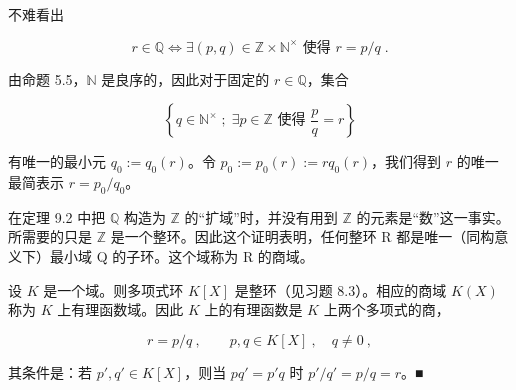 \begin{remark}

\begin{items}
\item

不难看出

\[
r\in\mathbb{Q}\Longleftrightarrow\exists\left(p,q\right)\in\mathbb{Z}\times\mathbb{N}^{\times}\text{ 使得 }r=p/q\;.
\]

由命题 5.5，$ \mathbb{N} $ 是良序的，因此对于固定的 $ r \in \mathbb{Q} $，集合

\[
\left\{q\in\mathbb{N}^{\times}\;;\;\exists p\in\mathbb{Z}\text{ 使得 }\frac{p}{q}=r\right\}
\]

有唯一的最小元 $ q_0 := q_0(r) $。令 $ p_0 := p_0(r) := r q_0(r) $，我们得到 $ r $ 的唯一最简表示 $ r = p_0/q_0 $。

\item

在定理 9.2 中把 $ \mathbb{Q} $ 构造为 $ \mathbb{Z} $ 的“扩域”时，并没有用到 $ \mathbb{Z} $ 的元素是“数”这一事实。所需要的只是 $ \mathbb{Z} $ 是一个整环。因此这个证明表明，任何整环 R 都是唯一（同构意义下）最小域 Q 的子环。这个域称为 R 的商域。

\item

设 $K$ 是一个域。则多项式环 $K[X]$ 是整环（见习题 8.3）。相应的商域 $K(X)$ 称为 $K$ 上有理函数域。因此 $K$ 上的有理函数是 $K$ 上两个多项式的商，

\[
r=p/q~,\qquad p,q\in K[X]~,\quad q\neq0~,
\]

其条件是：若 $ p', q' \in K[X] $，则当 $ pq' = p'q $ 时 $ p'/q' = p/q = r $。■

\end{items}

\end{remark}

